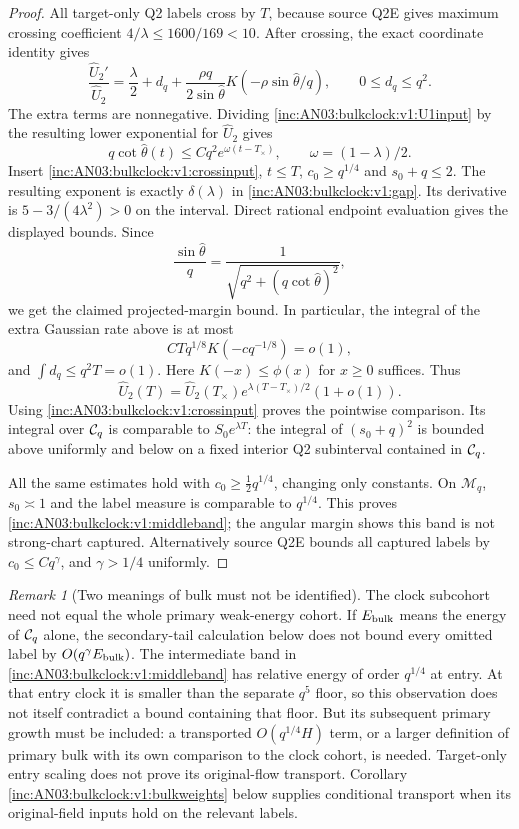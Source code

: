 \documentclass[11pt]{article}
\theoremstyle{remark}\newtheorem{remark}[theorem]{Remark}
\begin{document}
\begin{proof}
All target-only Q2 labels cross by $T$, because source Q2E gives maximum crossing coefficient $4/\lambda\le1600/169<10$. After crossing, the exact coordinate identity gives
\[
 \frac{\widehat U_2'}{\widehat U_2}
 =\frac\lambda2+d_q+\frac{\rho q}{2\sin\widehat\theta}
 K(-\rho\sin\widehat\theta/q),\qquad 0\le d_q\le q^2.
\]
The extra terms are nonnegative. Dividing \eqref{inc:AN03:bulkclock:v1:U1input} by the resulting lower exponential for $\widehat U_2$ gives
\[
 q\cot\widehat\theta(t)\le C q^2e^{\omega(t-T_\times)},\qquad
 \omega=(1-\lambda)/2.
\]
Insert \eqref{inc:AN03:bulkclock:v1:crossinput}, $t\le T$, $c_0\ge q^{1/4}$ and $s_0+q\le2$. The resulting exponent is exactly $\delta(\lambda)$ in \eqref{inc:AN03:bulkclock:v1:gap}. Its derivative is $5-3/(4\lambda^2)>0$ on the interval. Direct rational endpoint evaluation gives the displayed bounds. Since
\[
 \frac{\sin\widehat\theta}{q}=
 \frac1{\sqrt{q^2+(q\cot\widehat\theta)^2}},
\]
we get the claimed projected-margin bound. In particular, the integral of the extra Gaussian rate above is at most
\[
 C T q^{1/8}K(-c q^{-1/8})=o(1),
\]
and $\int d_q\le q^2T=o(1)$. Here $K(-x)\le\phi(x)$ for $x\ge0$ suffices. Thus
\[
 \widehat U_2(T)=\widehat U_2(T_\times)
 e^{\lambda(T-T_\times)/2}(1+o(1)).
\]
Using \eqref{inc:AN03:bulkclock:v1:crossinput} proves the pointwise comparison. Its integral over $\mathcal C_q$ is comparable to $S_0e^{\lambda T}$: the integral of $(s_0+q)^2$ is bounded above uniformly and below on a fixed interior Q2 subinterval contained in $\mathcal C_q$.

All the same estimates hold with $c_0\ge\tfrac12q^{1/4}$, changing only constants. On $\mathcal M_q$, $s_0\asymp1$ and the label measure is comparable to $q^{1/4}$. This proves \eqref{inc:AN03:bulkclock:v1:middleband}; the angular margin shows this band is not strong-chart captured. Alternatively source Q2E bounds all captured labels by $c_0\le Cq^\gamma$, and $\gamma>1/4$ uniformly.
\end{proof}

\begin{remark}[Two meanings of bulk must not be identified]
\label{inc:AN03:bulkclock:v1:twobulks}
The clock subcohort need not equal the whole primary weak-energy cohort. If $E_{\rm bulk}$ means the energy of $\mathcal C_q$ alone, the secondary-tail calculation below does not bound every omitted label by $O(q^\gamma E_{\rm bulk})$. The intermediate band in \eqref{inc:AN03:bulkclock:v1:middleband} has relative energy of order $q^{1/4}$ at entry. At that entry clock it is smaller than the separate $q^5$ floor, so this observation does not itself contradict a bound containing that floor. But its subsequent primary growth must be included: a transported $O(q^{1/4}H)$ term, or a larger definition of primary bulk with its own comparison to the clock cohort, is needed. Target-only entry scaling does not prove its original-flow transport. Corollary \ref{inc:AN03:bulkclock:v1:bulkweights} below supplies conditional transport when its original-field inputs hold on the relevant labels.
\end{remark}
\end{document}
